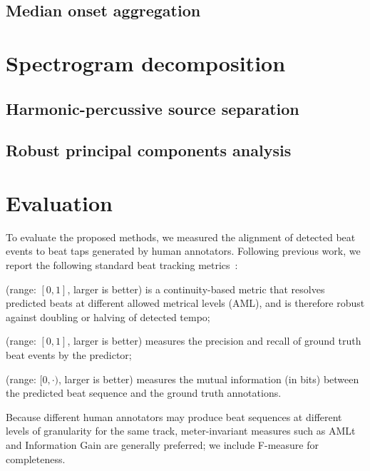\documentclass{article}
\begin{document}
\subsection{Median onset aggregation}


\section{Spectrogram decomposition}
\label{sec:spectrogram}


\subsection*{Harmonic-percussive source separation}
\cite{fitzgerald2010harmonic}

\subsection*{Robust principal components analysis}
\cite{candes2011robust}
\cite{yang2012sparse}


\section{Evaluation}
\label{sec:eval}

To evaluate the proposed methods, we measured the alignment of detected beat events to 
beat taps generated by human annotators.  Following previous work, we report the
following standard beat tracking metrics~\cite{davies2009evaluation}:
\begin{description}\addtolength{\itemsep}{-.75\baselineskip}
\item[AMLt] (range: $[0, 1]$, larger is better) is a continuity-based metric that
resolves predicted beats at different allowed metrical levels (AML), and is therefore 
robust against doubling or halving of detected tempo;
\item[F-measure] (range: $[0,1]$, larger is better) measures the precision and recall of ground truth beat events by the predictor; 
\item[Information gain] (range: $[0, \cdot)$, larger is better) measures the mutual information (in bits) between the predicted beat sequence and the ground truth annotations.
\end{description}
Because different human annotators may produce beat sequences at
different levels of granularity for the same track, meter-invariant measures such as
AMLt and Information Gain are generally preferred; we include F-measure for
completeness.
\end{document}
